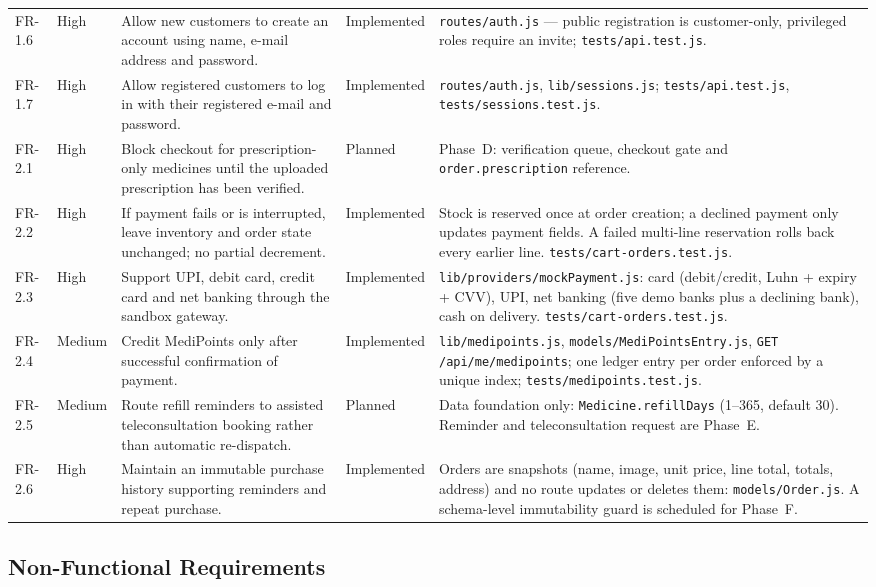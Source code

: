 \documentclass[11pt,a4paper]{article}
\begin{document}
{\begin{longtable}{@{}L{1.55cm}L{1.55cm}L{5.50cm}L{2.04cm}L{4.24cm}@{}}
FR-1.6 & High & Allow new customers to create an account using name, e-mail address and password. & Implemented & \texttt{routes/auth.js} --- public registration is customer-only, privileged roles require an invite; \texttt{tests/api.test.js}.\\
FR-1.7 & High & Allow registered customers to log in with their registered e-mail and password. & Implemented & \texttt{routes/auth.js}, \texttt{lib/sessions.js}; \texttt{tests/api.test.js}, \texttt{tests/sessions.test.js}.\\
FR-2.1 & High & Block checkout for prescription-only medicines until the uploaded prescription has been verified. & Planned & Phase~D: verification queue, checkout gate and \texttt{order.prescription} reference.\\
FR-2.2 & High & If payment fails or is interrupted, leave inventory and order state unchanged; no partial decrement. & Implemented & Stock is reserved once at order creation; a declined payment only updates payment fields. A failed multi-line reservation rolls back every earlier line. \texttt{tests/cart-orders.test.js}.\\
FR-2.3 & High & Support UPI, debit card, credit card and net banking through the sandbox gateway. & Implemented & \texttt{lib/providers/mockPayment.js}: card (debit/credit, Luhn + expiry + CVV), UPI, net banking (five demo banks plus a declining bank), cash on delivery. \texttt{tests/cart-orders.test.js}.\\
FR-2.4 & Medium & Credit MediPoints only after successful confirmation of payment. & Implemented & \texttt{lib/medipoints.js}, \texttt{models/MediPointsEntry.js}, \texttt{GET /api/me/medipoints}; one ledger entry per order enforced by a unique index; \texttt{tests/medipoints.test.js}.\\
FR-2.5 & Medium & Route refill reminders to assisted teleconsultation booking rather than automatic re-dispatch. & Planned & Data foundation only: \texttt{Medicine.refillDays} (1--365, default 30). Reminder and teleconsultation request are Phase~E.\\
FR-2.6 & High & Maintain an immutable purchase history supporting reminders and repeat purchase. & Implemented & Orders are snapshots (name, image, unit price, line total, totals, address) and no route updates or deletes them: \texttt{models/Order.js}. A schema-level immutability guard is scheduled for Phase~F.\\
\end{longtable}
}

\subsection{Non-Functional Requirements}
\end{document}
